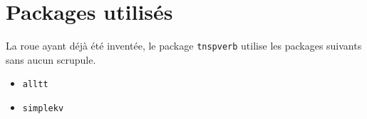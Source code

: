 \documentclass[12pt,a4paper]{article}
\begin{document}
\section{Packages utilisés}

La roue ayant déjà été inventée, le package \verb#tnspverb# utilise les packages suivants sans aucun scrupule.

\begin{multicols}{4}
    \begin{itemize}
\item \verb#alltt#
    \item \verb#simplekv#
    \end{itemize}
\end{multicols}
\end{document}
